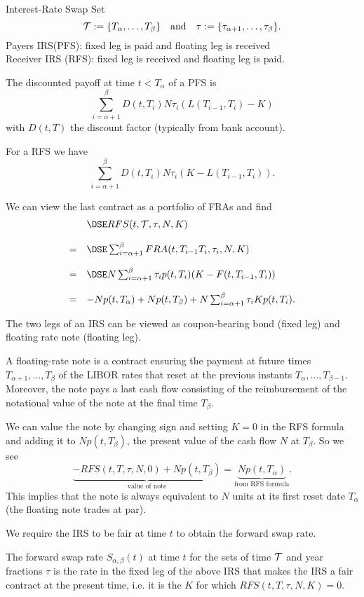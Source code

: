 Interest-Rate Swap
	Set
		$${\cal T}:=\{T_{\alpha},\ldots ,T_{\beta}\}\quad\mbox{and}\quad
		\tau:=\{\tau_{\alpha+1},\ldots,\tau_{\beta}\}.
		$$
	Payers IRS(PFS):
	fixed leg is paid and floating leg is received \\
	Receiver IRS (RFS): fixed leg is received and floating leg is
	paid.

	The discounted payoff at time $t<T_{\alpha}$ of a PFS is
		$$
		\sum_{i=\alpha+1}^{\beta}D(t,T_i)N\tau_i(L(T_{i-1},T_i)-K)
		$$
	with $D(t,T)$ the discount factor (typically from bank account).
	
	For a RFS we have
		$$
		\sum_{i=\alpha+1}^{\beta}D(t,T_i)N\tau_i(K-L(T_{i-1},T_i)).
		$$

	We can view the last contract as a portfolio of FRAs and find
		$$
		\begin{array}{ll}
		& \DSE RFS(t,{\cal T},\tau,N,K) \\*[12pt] = & \DSE \sum_{i=\alpha+1}^{\beta}FRA(t,T_{i-1}T_i,\tau_i,N,K) \\*[12pt]
		= & \DSE N\sum_{i=\alpha+1}^{\beta}\tau_i p(t,T_i)(K-F(t,T_{i-1},T_i))\\*[12pt]
		= & -N   p(t,T_{\alpha})+Np(t,T_{\beta})+N\sum_{i=\alpha+1}^{\beta}\tau_i Kp(t,T_i).
		\end{array}
		$$

	The two legs of an IRS can be viewed as coupon-bearing bond (fixed leg) and floating rate note (floating leg).

	A floating-rate note is a contract ensuring the payment at future times
	$T_{\alpha+1},\ldots,T_{\beta}$ of the LIBOR rates that reset at the previous instants
	$T_{\alpha},\ldots,T_{\beta-1}$. Moreover, the note pays a last
	cash flow consisting of the reimbursement of the notational value
	of the note at the final time $T_{\beta}$.

	We can value the note by changing sign and setting $K=0$ in the
	RFS formula and adding it to $Np(t,T_{\beta})$, the present value
	of the cash flow $N$ at $T_{\beta}$. So we see
		$$
		\underbrace{-RFS(t,T,\tau,N,0)+Np(t,T_{\beta})}_{\mbox{value of note}}=
		\underbrace{Np(t,T_{\alpha})}_{\mbox{from RFS formula}}.
		$$
	This implies that the note is always equivalent to $N$ units at
	its first reset date $T_{\alpha}$ (the floating note trades at
	par). 

	We require the IRS to be fair at time $t$ to obtain the
	forward swap rate.

	The forward swap rate $S_{\alpha,\beta}(t)$ at time $t$ for the
	sets of time $\cal T$ and year fractions $\tau$ is the rate in the
	fixed leg of the above IRS that makes the IRS a fair contract at
	the present time, i.e. it is the $K$ for which
	$RFS(t,T,\tau,N,K)=0$.

